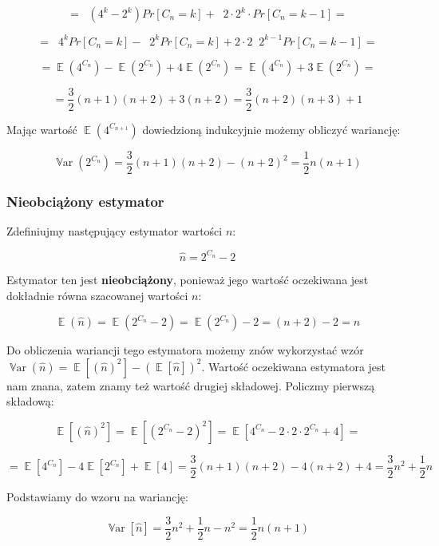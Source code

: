 \documentclass{article}
\DeclareMathOperator{\EX}{\mathbb{E}}%
\DeclareMathOperator{\Var}{\mathbb{V}ar}%
\DeclareMathOperator{\sumk}{\sum_{k \ge 0}}
\begin{document}
    \[ = \sumk (4^k - 2^k) Pr[C_n=k] + \sumk 2 \cdot 2^k \cdot Pr[C_n=k-1] = \]

    \[ = \sumk 4^k Pr[C_n=k] - \sumk 2^k Pr[C_n=k] + 2 \cdot 2 \sumk 2^{k-1} Pr[C_n=k-1] = \]

    \[ = \EX(4^{C_n}) - \EX(2^{C_n}) + 4\EX(2^{C_n}) = \EX(4^{C_n}) + 3\EX(2^{C_n}) = \]

    \[ = \frac{3}{2}(n+1)(n+2) + 3(n+2) = \frac{3}{2}(n+2)(n+3) + 1 \]

    Mając wartość $\EX(4^{C_{n+1}})$ dowiedzioną indukcyjnie możemy obliczyć wariancję:

    \[ \Var(2^{C_n}) = \frac{3}{2}(n+1)(n+2) - (n+2)^2 = \frac{1}{2}n(n+1) \]
    \subsubsection{Nieobciążony estymator}
    Zdefiniujmy następujący estymator wartości $n$:

    \[ \hat{n} = 2^{C_n} - 2 \]

    Estymator ten jest \textbf{nieobciążony}, ponieważ jego wartość oczekiwana jest dokładnie równa szacowanej wartości $n$:

    \[ \EX(\hat{n}) = \EX(2^{C_n} - 2) = \EX(2^{C_n}) - 2 = (n + 2) - 2 = n \]

    Do obliczenia wariancji tego estymatora możemy znów wykorzystać wzór $\Var(\hat{n}) = \EX[(\hat{n})^2] - (\EX[\hat{n}])^2$. Wartość oczekiwana estymatora jest nam znana, zatem znamy też wartość drugiej składowej. Policzmy pierwszą składową:

    \[ \EX[(\hat{n})^2] = \EX[(2^{C_n}-2)^2] = \EX[4^{C_n} - 2 \cdot 2 \cdot 2^{C_n} + 4] = \]

    \[ = \EX[4^{C_n}] - 4\EX[2^{C_n}] + \EX[4] = \frac{3}{2}(n+1)(n+2) - 4(n+2) + 4 = \frac{3}{2}n^2 + \frac{1}{2}n \]

    Podstawiamy do wzoru na wariancję:

    \[ \Var[\hat{n}] = \frac{3}{2}n^2 + \frac{1}{2}n - n^2 = \frac{1}{2}n(n+1) \]

    
\end{document}
